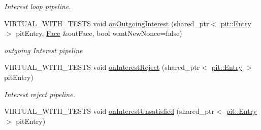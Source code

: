 \begin{DoxyCompactItemize}
\begin{DoxyCompactList}\small\item\em Interest loop pipeline. \end{DoxyCompactList}\item 
V\+I\+R\+T\+U\+A\+L\+\_\+\+W\+I\+T\+H\+\_\+\+T\+E\+S\+TS void \hyperlink{classnfd_1_1Forwarder_a4a355e3bff22483c081925ae75c44f6b}{on\+Outgoing\+Interest} (shared\+\_\+ptr$<$ \hyperlink{classnfd_1_1pit_1_1Entry}{pit\+::\+Entry} $>$ pit\+Entry, \hyperlink{classnfd_1_1Face}{Face} \&out\+Face, bool want\+New\+Nonce=false)\hypertarget{classnfd_1_1Forwarder_a4a355e3bff22483c081925ae75c44f6b}{}\label{classnfd_1_1Forwarder_a4a355e3bff22483c081925ae75c44f6b}

\begin{DoxyCompactList}\small\item\em outgoing Interest pipeline \end{DoxyCompactList}\item 
V\+I\+R\+T\+U\+A\+L\+\_\+\+W\+I\+T\+H\+\_\+\+T\+E\+S\+TS void \hyperlink{classnfd_1_1Forwarder_add3fa38ce3575dc0979962d41b09859d}{on\+Interest\+Reject} (shared\+\_\+ptr$<$ \hyperlink{classnfd_1_1pit_1_1Entry}{pit\+::\+Entry} $>$ pit\+Entry)\hypertarget{classnfd_1_1Forwarder_add3fa38ce3575dc0979962d41b09859d}{}\label{classnfd_1_1Forwarder_add3fa38ce3575dc0979962d41b09859d}

\begin{DoxyCompactList}\small\item\em Interest reject pipeline. \end{DoxyCompactList}\item 
V\+I\+R\+T\+U\+A\+L\+\_\+\+W\+I\+T\+H\+\_\+\+T\+E\+S\+TS void \hyperlink{classnfd_1_1Forwarder_ac5dc6c23fe28e323e2de5ceb43860cf5}{on\+Interest\+Unsatisfied} (shared\+\_\+ptr$<$ \hyperlink{classnfd_1_1pit_1_1Entry}{pit\+::\+Entry} $>$ pit\+Entry)\hypertarget{classnfd_1_1Forwarder_ac5dc6c23fe28e323e2de5ceb43860cf5}{}\label{classnfd_1_1Forwarder_ac5dc6c23fe28e323e2de5ceb43860cf5}


\end{DoxyCompactItemize}
